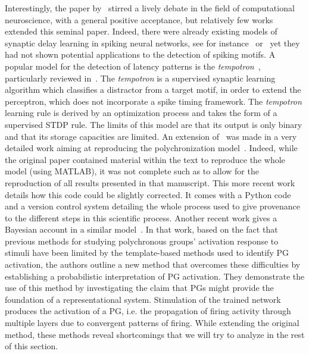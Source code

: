 \documentclass[brainsci, %
               review,submit,pdftex,moreauthors
               ]{Definitions/mdpi}
\begin{document}
Interestingly, the paper by~\citep{izhikevich_polychronization_2006} stirred a lively debate in the field of computational neuroscience, with a general positive acceptance, but relatively few works extended this seminal paper. Indeed, there were already existing models of synaptic delay learning in spiking neural networks, see for instance~\citep{huning_synaptic_1998} or~\citep{eurich_dynamics_1999} yet they had not shown potential applications to the detection of spiking motifs. A popular model for the detection of latency patterns is the \emph{tempotron}~\citep{gutig_tempotron_2006}, particularly reviewed in~\citep{gutig_spike_2014}. The \emph{tempotron} is a supervised synaptic learning algorithm which classifies a distractor from a target motif, in order to extend the perceptron, which does not incorporate a spike timing framework. The \emph{tempotron} learning rule is derived by an optimization process and takes the form of a supervised STDP rule. The limits of this model are that its output is only binary and that its storage capacities are limited. An extension of~\citep{izhikevich_polychronization_2006} was made in a very detailed work aiming at reproducing the polychronization model~\citep{pauli_reproducing_2018}. Indeed, while the original paper contained material within the text to reproduce the whole model (using MATLAB), it was not complete such as to allow for the reproduction of all results presented in that manuscript. This more recent work details how this code could be slightly corrected. It comes with a Python code and a version control system detailing the whole process used to give provenance to the different steps in this scientific process. Another recent work gives a Bayesian account in a similar model~\citep{guise_bayesian_2014}. In that work, based on the fact that previous methods for studying polychronous groups' activation response to stimuli have been limited by the template-based methods used to identify PG activation, the authors outline a new method that overcomes these difficulties by establishing a probabilistic interpretation of PG activation. They demonstrate the use of this method by investigating the claim that PGs might provide the foundation of a representational system. Stimulation of the trained network produces the activation of a PG, i.e. the propagation of firing activity through multiple layers due to convergent patterns of firing. While extending the original method, these methods reveal shortcomings that we will try to analyze in the rest of this section.
\end{document}
